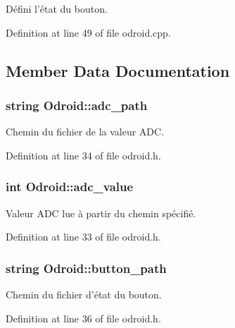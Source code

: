 Défini l'état du bouton. 



Definition at line 49 of file odroid.\-cpp.



\subsection{Member Data Documentation}
\hypertarget{classOdroid_a93391450090b2f8676e261bb6f8ac961}{
\subsubsection[{adc\-\_\-path}]{\setlength{\rightskip}{0pt plus 5cm}string Odroid\-::adc\-\_\-path\hspace{0.3cm}{\ttfamily [private]}}}\label{classOdroid_a93391450090b2f8676e261bb6f8ac961}
Chemin du fichier de la valeur A\-D\-C. 

Definition at line 34 of file odroid.\-h.

\hypertarget{classOdroid_aeb57a9bb759c9c45cd5fb5a90ea75a0a}{
\subsubsection[{adc\-\_\-value}]{\setlength{\rightskip}{0pt plus 5cm}int Odroid\-::adc\-\_\-value\hspace{0.3cm}{\ttfamily [private]}}}\label{classOdroid_aeb57a9bb759c9c45cd5fb5a90ea75a0a}
Valeur A\-D\-C lue à partir du chemin spécifié. 

Definition at line 33 of file odroid.\-h.

\hypertarget{classOdroid_af5c8c0acd24f1d38ae2181a4d659ecd8}{
\subsubsection[{button\-\_\-path}]{\setlength{\rightskip}{0pt plus 5cm}string Odroid\-::button\-\_\-path\hspace{0.3cm}{\ttfamily [private]}}}\label{classOdroid_af5c8c0acd24f1d38ae2181a4d659ecd8}
Chemin du fichier d'état du bouton. 

Definition at line 36 of file odroid.\-h.

